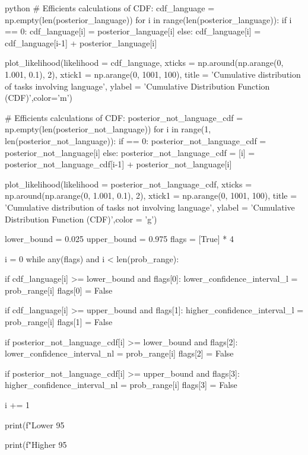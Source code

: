 \documentclass[12pt]{amsart}
\begin{document}
\begin{mintedbox}{python}
# Efficients calculations of CDF:
cdf_language = np.empty(len(posterior_language))
for i in range(len(posterior_language)):
    if i == 0:
        cdf_language[i] = posterior_language[i]
    else:
        cdf_language[i] = cdf_language[i-1] + posterior_language[i]

plot_likelihood(likelihood = cdf_language,
                xticks     = np.around(np.arange(0, 1.001, 0.1), 2),
                xtick1     = np.arange(0, 1001, 100),
                title      = 'Cumulative distribution of tasks involving language',
                ylabel     = 'Cumulative Distribution Function (CDF)',color='m')

# Efficients calculations of CDF:
posterior_not_language_cdf = np.empty(len(posterior_not_language))
for i in range(1, len(posterior_not_language)):
    if == 0:
        posterior_not_language_cdf = posterior_not_language[i]
    else:
        posterior_not_language_cdf = [i] = posterior_not_language_cdf[i-1] + posterior_not_language[i]

plot_likelihood(likelihood = posterior_not_language_cdf,
                xticks     = np.around(np.arange(0, 1.001, 0.1), 2),
                xtick1     = np.arange(0, 1001, 100),
                title      = 'Cumulative distribution of tasks not involving language',
                ylabel     = 'Cumulative Distribution Function (CDF)',color      = 'g')

lower_bound = 0.025
upper_bound = 0.975
flags = [True] * 4

i = 0
while any(flags) and i < len(prob_range):

    
    if cdf_language[i] >= lower_bound and flags[0]:
        lower_confidence_interval_l = prob_range[i]
        flags[0] = False
        

    if cdf_language[i] >= upper_bound and flags[1]:
        higher_confidence_interval_l = prob_range[i]
        flags[1] = False

    if posterior_not_language_cdf[i] >= lower_bound and flags[2]:
        lower_confidence_interval_nl = prob_range[i]
        flags[2] = False
        

    if posterior_not_language_cdf[i] >= upper_bound and flags[3]:
        higher_confidence_interval_nl = prob_range[i]
        flags[3] = False

    i += 1
        
        
print(f"Lower 95%

print(f"Higher 95%


\end{mintedbox}
\end{document}
